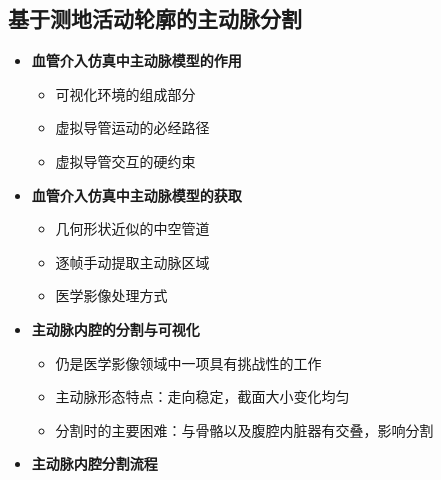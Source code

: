 \subsection[主动脉分割]{基于测地活动轮廓的主动脉分割}

\begin{frame}
\begin{itemize}
\item \textbf{血管介入仿真中主动脉模型的作用}
\begin{itemize}
\item 可视化环境的组成部分
\item 虚拟导管运动的必经路径
\item 虚拟导管交互的硬约束
\end{itemize}
\pause \item \textbf{血管介入仿真中主动脉模型的获取}
\begin{itemize}
\item 几何形状近似的中空管道
\item 逐帧手动提取主动脉区域
\item 医学影像处理方式
\end{itemize}
\pause \item \textbf{主动脉内腔的分割与可视化}
\begin{itemize}
\item 仍是医学影像领域中一项具有挑战性的工作
\item 主动脉形态特点：走向稳定，截面大小变化均匀
\item 分割时的主要困难：与骨骼以及腹腔内脏器有交叠，影响分割
\end{itemize}
\end{itemize}
\end{frame} 

\begin{frame}
\begin{itemize}
\item \textbf{主动脉内腔分割流程}
\end{itemize}
\begin{figure}[t]
\centering

\end{figure}
\end{frame}


